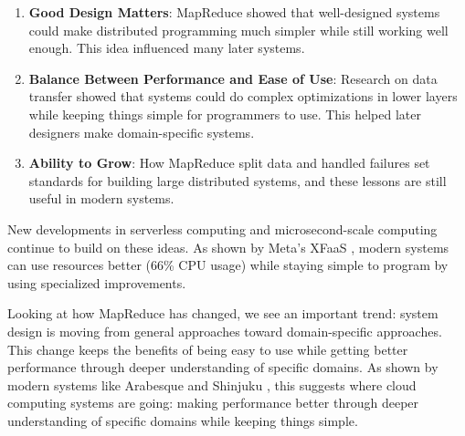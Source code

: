 \documentclass[12pt]{article}
\begin{document}
\begin{enumerate}
\item \textbf{Good Design Matters}: MapReduce showed that well-designed systems could make distributed programming much simpler while still working well enough. This idea influenced many later systems.

\item \textbf{Balance Between Performance and Ease of Use}: Research on data transfer showed that systems could do complex optimizations in lower layers while keeping things simple for programmers to use. This helped later designers make domain-specific systems.

\item \textbf{Ability to Grow}: How MapReduce split data and handled failures set standards for building large distributed systems, and these lessons are still useful in modern systems.
\end{enumerate}

New developments in serverless computing \cite{jonas2019cloud} and microsecond-scale computing \cite{barroso2017attack} continue to build on these ideas. As shown by Meta's XFaaS \cite{shahrad2020serverless}, modern systems can use resources better (66\% CPU usage) while staying simple to program by using specialized improvements.

Looking at how MapReduce has changed, we see an important trend: system design is moving from general approaches toward domain-specific approaches. This change keeps the benefits of being easy to use while getting better performance through deeper understanding of specific domains. As shown by modern systems like Arabesque \cite{teixeira2015arabesque} and Shinjuku \cite{kaffes2019shinjuku}, this suggests where cloud computing systems are going: making performance better through deeper understanding of specific domains while keeping things simple.

\newpage

\end{document}
